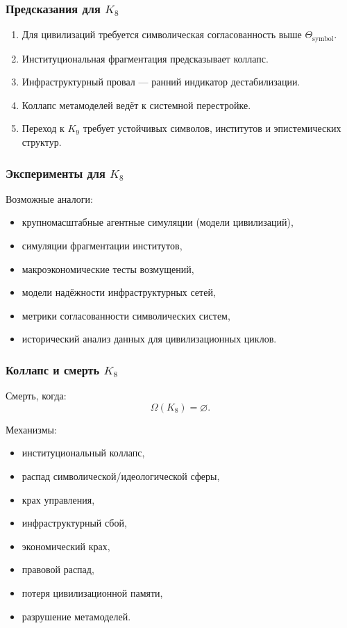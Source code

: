 \subsubsection{Предсказания для \texorpdfstring{$K_8$}{K_8}}

\begin{enumerate}
    \item Для цивилизаций требуется символическая согласованность выше $\Theta_{\mathrm{symbol}}$.
    \item Институциональная фрагментация предсказывает коллапс.
    \item Инфраструктурный провал — ранний индикатор дестабилизации.
    \item Коллапс метамоделей ведёт к системной перестройке.
    \item Переход к $K_9$ требует устойчивых символов, институтов и эпистемических структур.
\end{enumerate}

\subsubsection{Эксперименты для \texorpdfstring{$K_8$}{K_8}}

Возможные аналоги:
\begin{itemize}
    \item крупномасштабные агентные симуляции (модели цивилизаций),
    \item симуляции фрагментации институтов,
    \item макроэкономические тесты возмущений,
    \item модели надёжности инфраструктурных сетей,
    \item метрики согласованности символических систем,
    \item исторический анализ данных для цивилизационных циклов.
\end{itemize}

\subsubsection{Коллапс и смерть \texorpdfstring{$K_8$}{K_8}}

Смерть, когда:
\[
\Omega(K_8)=\varnothing.
\]

Механизмы:
\begin{itemize}
    \item институциональный коллапс,
    \item распад символической/идеологической сферы,
    \item крах управления,
    \item инфраструктурный сбой,
    \item экономический крах,
    \item правовой распад,
    \item потеря цивилизационной памяти,
    \item разрушение метамоделей.
\end{itemize}

